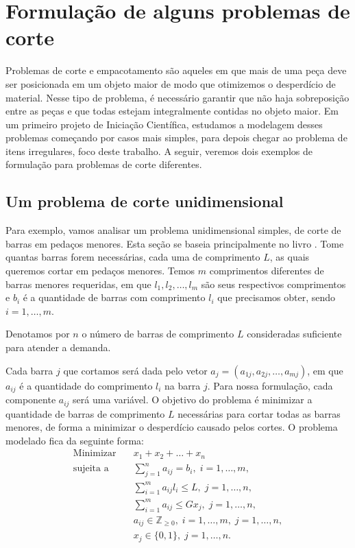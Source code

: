 \documentclass{article}
\begin{document}
\section{Formulação de alguns problemas de corte} \label{sec:outros}

Problemas de corte e empacotamento são aqueles em que mais de uma peça deve ser posicionada em um objeto maior de modo que otimizemos o desperdício de material. Nesse tipo de problema, é necessário garantir que não haja sobreposição entre as peças e que todas estejam integralmente contidas no objeto maior. Em um primeiro projeto de Iniciação Científica, estudamos a modelagem desses problemas começando por casos mais simples, para depois chegar ao problema de itens irregulares, foco deste trabalho. A seguir, veremos dois exemplos de formulação para problemas de corte diferentes.

\subsection{Um problema de corte unidimensional}

Para exemplo, vamos analisar um problema unidimensional simples, de corte de barras em pedaços menores. Esta seção se baseia principalmente no livro \cite{arenales}. Tome quantas barras forem necessárias, cada uma de comprimento $L$, as quais queremos cortar em pedaços menores. Temos $m$ comprimentos diferentes de barras menores requeridas, em que $l_1, l_2, \dots, l_m$ são seus respectivos comprimentos e $b_i$ é a quantidade de barras com comprimento $l_i$ que precisamos obter, sendo $i = 1, \dots, m$.

Denotamos por $n$ o número de barras de comprimento $L$ consideradas suficiente para atender a demanda.

Cada barra $j$ que cortamos será dada pelo vetor $a_j = (a_{1j}, a_{2j}, \dots, a_{mj})$, em que $a_{ij}$ é a quantidade do comprimento $l_i$ na barra $j$. Para nossa formulação, cada componente $a_{ij}$ será uma variável. O objetivo do problema é minimizar a quantidade de barras de comprimento $L$ necessárias para cortar todas as barras menores, de forma a minimizar o desperdício causado pelos cortes. O problema modelado fica da seguinte forma:
\begin{equation*}
   \begin{aligned}
    \textrm{Minimizar} \quad & x_1 + x_2 + \dots + x_n\\
    \textrm{sujeita a} \quad & \sum_{j=1}^n a_{ij} = b_i, \; i = 1, \dots, m,\\
      &  \sum_{i=1}^m a_{ij}l_i \leq L, \; j = 1, \dots, n,   \\
      &  \sum_{i=1}^m a_{ij} \leq Gx_j , \; j = 1, \dots, n,\\
      & a_{ij} \in \mathbb{Z}_{\geq 0}, \; i = 1, \dots, m, \; j= 1, \dots, n,\\
      & x_j \in \{0,1\}, \; j=1, \dots, n.\\
    \end{aligned}
\end{equation*}
\end{document}
